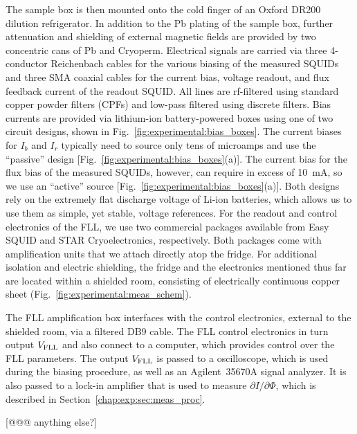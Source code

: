 The sample box is then mounted onto the cold finger of an Oxford DR200 dilution refrigerator. In addition to the Pb plating of the sample box, further attenuation and shielding of external magnetic fields are provided by two concentric cans of Pb and Cryoperm. Electrical signals are carried via three 4-conductor Reichenbach cables for the various biasing of the measured SQUIDs and three SMA coaxial cables for the current bias, voltage readout, and flux feedback current of the readout SQUID. All lines are rf-filtered using standard copper powder filters (CPFs) and low-pass filtered using discrete filters. Bias currents are provided via lithium-ion battery-powered boxes using one of two circuit designs, shown in Fig.~\ref{fig:experimental:bias_boxes}. The current biases for $I_b$ and $I_r$ typically need to source only tens of microamps and use the ``passive'' design  [Fig.~\ref{fig:experimental:bias_boxes}(a)]. The current bias for the flux bias of the measured SQUIDs, however, can require in excess of 10~mA, so we use an ``active'' source [Fig.~\ref{fig:experimental:bias_boxes}(a)]. Both designs rely on the extremely flat discharge voltage of Li-ion batteries, which allows us to use them as simple, yet stable, voltage references. For the readout and control electronics of the FLL, we use two commercial packages available from Easy SQUID and STAR Cryoelectronics, respectively. Both packages come with amplification units that we attach directly atop the fridge. For additional isolation and electric shielding, the fridge and the electronics mentioned thus far are located within a shielded room, consisting of electrically continuous copper sheet (Fig.~\ref{fig:experimental:meas_schem}).

The FLL amplification box interfaces with the control electronics, external to the shielded room, via a filtered DB9 cable. The FLL control electronics in turn output $V_\text{FLL}$ and also connect to a computer, which provides control over the FLL parameters. The output $V_\text{FLL}$ is passed to a oscilloscope, which is used during the biasing procedure, as well as an Agilent~35670A signal analyzer. It is also passed to a lock-in amplifier that is used to measure $\partial I/\partial \Phi$, which is described in Section~\ref{chap:exp:sec:meas_proc}.

[@@@ anything else?]

